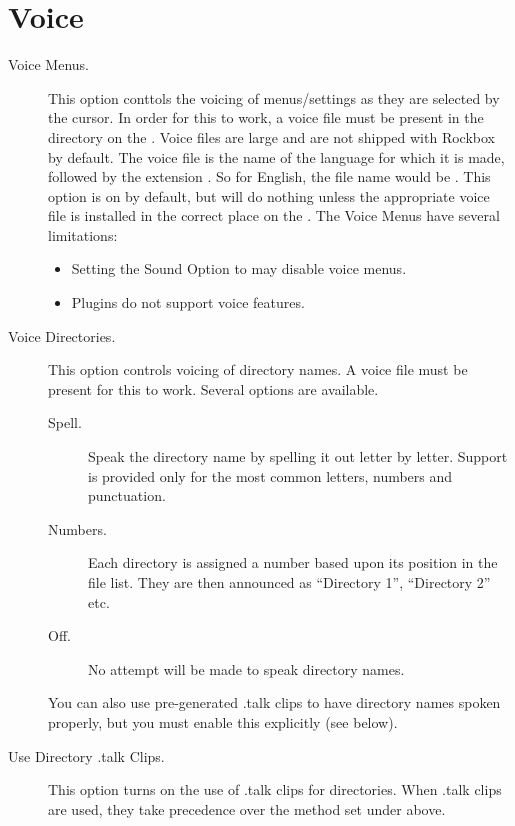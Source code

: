 \section{\label{ref:Voiceconfiguration}Voice}

  \begin{description}
  \item[Voice Menus.]
    This option conttols the voicing of menus/settings as they are selected
    by the cursor. In order for this to work, a voice file must be present 
    in the  directory on the \dap.  Voice files are large
    and are not  shipped with Rockbox by default.
    The voice file is the name of the language for which it is made, followed
    by the extension .  So for English, the file name would be 
    .
    This option is on by default, but will do nothing unless the 
    appropriate voice file is installed in the correct place on the \dap.
    The Voice Menus have several limitations:
    \begin{itemize}
    \item Setting the Sound Option  to  may 
      disable voice menus.
    \item Plugins  do not support
      voice features.
    \end{itemize}

  \item[Voice Directories.]
    This option controls voicing of directory names. A voice file must be present 
    for this to work. Several options are available.
    \begin{description}
    \item[Spell.]
      Speak the directory name by spelling it out letter by letter.  Support
      is provided only for the most common letters, numbers and punctuation.
    \item[Numbers.]
      Each directory is assigned a number based upon its position in the
      file list.  They are then announced as ``Directory 1'', ``Directory 2''
      etc.
    \item[Off.]
      No attempt will be made to speak directory names.
    \end{description}
    You can also use pre-generated .talk clips to have  directory names spoken 
    properly, but you must enable this explicitly (see below).

  \item[Use Directory .talk Clips.]
    This option turns on the use of .talk clips for directories. When .talk clips
    are used, they take precedence over the method set under  
    above.


\end{description}
